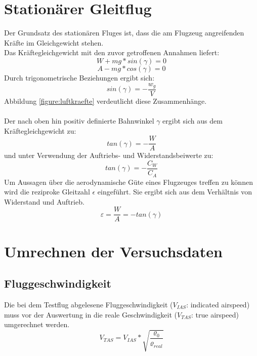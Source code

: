 \section{Stationärer Gleitflug}
Der Grundsatz des stationären Fluges ist, dass die am Flugzeug angreifenden Kräfte im Gleichgewicht stehen. \\
Das Kräftegleichgewicht mit den zuvor getroffenen Annahmen liefert:
\begin{equation}
\label{eq:kräftegleichgewichtWiderstand}
W + mg*sin(\gamma) = 0
\end{equation}
%
%
%
\begin{equation}
\label{eq:kräftegleichgewichtAuftrieb}
A - mg*cos(\gamma) = 0
\end{equation}
Durch trigonometrische Beziehungen ergibt sich:
\begin{equation}
\label{eq:bahnneigungswinkel}
sin(\gamma) = -\frac{w_g}{V}
\end{equation}
%
%
Abbildung \ref{figure:luftkraefte} verdeutlicht diese Zusammenhänge.\\ \\
Der nach oben hin positiv definierte Bahnwinkel $\gamma$ ergibt sich aus dem Kräftegleichgewicht zu:
\begin{equation}
tan(\gamma)=-\frac{W}{A}
\end{equation}
und unter Verwendung der Auftriebs- und Widerstandsbeiwerte zu:
\begin{equation}
tan(\gamma)=-\frac{C_W}{C_A}
\end{equation}
%
%
Um Aussagen über die aerodynamische Güte eines Flugzeuges treffen zu können wird die reziproke Gleitzahl $\epsilon$ eingeführt. Sie ergibt sich aus dem Verhältnis von Widerstand und Auftrieb.
\begin{equation}
\varepsilon=\frac{W}{A}=-tan(\gamma)
\end{equation}
%

\section{Umrechnen der Versuchsdaten}
\subsection{Fluggeschwindigkeit}
Die bei dem Testflug abgelesene Fluggeschwindigkeit ($V_{IAS}$: indicated airspeed) muss vor der Auswertung in die reale Geschwindigkeit ($V_{TAS}$: true airspeed) umgerechnet werden.
\begin{equation}
V_{TAS}=V_{IAS}*\sqrt{\frac{\varrho_0}{\varrho_{real}}}
\end{equation}

\newpage